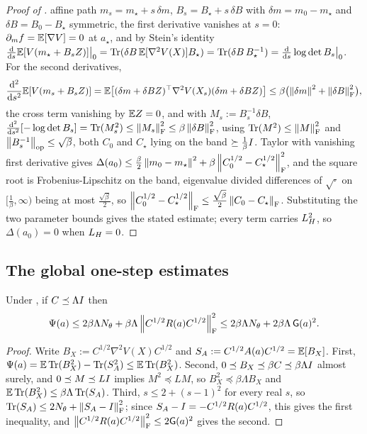 \begin{proof}[Proof of ]
affine path $m_s=m_\star+s\,\delta m$, $B_s=B_\star+s\,\delta B$ with $\delta m=m_0-m_\star$ and
$\delta B=B_0-B_\star$ symmetric, the first derivative vanishes at $s=0$: $\partial_mf=\mathbb{E}[\nabla V]=0$
at $a_\star$, and by Stein's identity
$\tfrac{\mathrm{d}}{\mathrm{d} s}\mathbb{E}[V(m_\star+B_sZ)]\big|_0=\operatorname{Tr}(\delta B\,\mathbb{E}[\nabla^2V(X)]B_\star)=\operatorname{Tr}(\delta B\,B_\star^{-1})
=\tfrac{\mathrm{d}}{\mathrm{d} s}\log\det B_s\big|_0$. For the second derivatives,
\[
    \frac{\mathrm{d}^2}{\mathrm{d} s^2}\mathbb{E}[V(m_s+B_sZ)]
    =\mathbb{E}\bigl[(\delta m+\delta BZ)^\top\nabla^2V(X_s)(\delta m+\delta BZ)\bigr]
    \leq\beta\bigl(\left\lVert \delta m\right\rVert^2+\left\lVert \delta B\right\rVert_{\mathrm{F}}^2\bigr),
\]
the cross term vanishing by $\mathbb{E} Z=0$, and with $M_s:=B_s^{-1}\delta B$,
$\tfrac{\mathrm{d}^2}{\mathrm{d} s^2}[-\log\det B_s]=\operatorname{Tr}(M_s^2)\leq\left\lVert M_s\right\rVert_{\mathrm{F}}^2\leq\beta\left\lVert \delta B\right\rVert_{\mathrm{F}}^2$,
using $\operatorname{Tr}(M^2)\leq\left\lVert M\right\rVert_{\mathrm{F}}^2$ and $\left\lVert B_s^{-1}\right\rVert_{\mathrm{op}}\leq\sqrt\beta$, both $C_0$ and $C_\star$
lying on the band $\succeq\tfrac1\beta I$. Taylor with vanishing first derivative gives
$\Delta(a_0)\leq\tfrac\beta2\left\lVert m_0-m_\star\right\rVert^2+\beta\left\lVert C_0^{1/2}-C_\star^{1/2}\right\rVert_{\mathrm{F}}^2$, and the
square root is Frobenius-Lipschitz on the band, eigenvalue divided differences of $\sqrt\cdot$ on
$[\tfrac1\beta,\infty)$ being at most $\tfrac{\sqrt\beta}2$, so
$\left\lVert C_0^{1/2}-C_\star^{1/2}\right\rVert_{\mathrm{F}}\leq\tfrac{\sqrt\beta}2\left\lVert C_0-C_\star\right\rVert_{\mathrm{F}}$. Substituting
the two parameter bounds gives the stated estimate; every term carries $L_H^2$, so $\Delta(a_0)=0$ when
$L_H=0$.
\end{proof}

\subsection{The global one-step estimates}

\begin{lemma}
\label{lem:Psi-selfbound}
Under , if $C\preceq\Lambda I$ then
\begin{equation}
\label{eq:Psi-selfbound}
    \Psi(a)\leq2\beta\Lambda N_\theta+\beta\Lambda\left\lVert C^{1/2}R(a)C^{1/2}\right\rVert_{\mathrm{F}}^2
    \leq2\beta\Lambda N_\theta+2\beta\Lambda\,\mathsf{G}(a)^2 .
\end{equation}
\end{lemma}

\begin{proof}
Write $B_X:=C^{1/2}\nabla^2V(X)C^{1/2}$ and $S_A:=C^{1/2}A(a)C^{1/2}=\mathbb{E}[B_X]$. First,
$\Psi(a)=\mathbb{E}\operatorname{Tr}(B_X^2)-\operatorname{Tr}(S_A^2)\leq\mathbb{E}\operatorname{Tr}(B_X^2)$. Second, $0\preceq B_X\preceq\beta C\preceq\beta\Lambda I$
almost surely, and $0\preceq M\preceq LI$ implies $M^2\preceq LM$, so $B_X^2\preceq\beta\Lambda B_X$
and $\mathbb{E}\operatorname{Tr}(B_X^2)\leq\beta\Lambda\operatorname{Tr}(S_A)$. Third, $s\leq2+(s-1)^2$ for every real $s$, so
$\operatorname{Tr}(S_A)\leq2N_\theta+\left\lVert S_A-I\right\rVert_{\mathrm{F}}^2$; since $S_A-I=-C^{1/2}R(a)C^{1/2}$, this gives the
first inequality, and $\left\lVert C^{1/2}R(a)C^{1/2}\right\rVert_{\mathrm{F}}^2\leq2\mathsf{G}(a)^2$ gives the second.
\end{proof}

